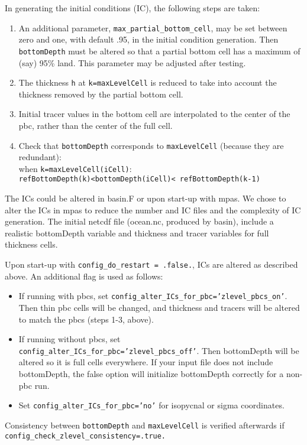 \documentclass[11pt]{report}
\begin{document}
In generating the initial conditions (IC), the following steps are taken:
\begin{enumerate}
\item An additional parameter, {\tt max\_partial\_bottom\_cell}, may be set between zero and one, with default .95, in the initial condition generation.  Then {\tt bottomDepth} must be altered so that a partial bottom cell has a maximum of (say) 95\% land.  This parameter may be adjusted after testing. 
\item The thickness {\tt h} at {\tt k=maxLevelCell} is reduced to take into account the thickness removed by the partial bottom cell.
\item Initial tracer values in the bottom cell are interpolated to the center of the pbc, rather than the center of the full cell.
\item Check that {\tt bottomDepth} corresponds to {\tt maxLevelCell} (because they are redundant):\\
when {\tt k=maxLevelCell(iCell)}:\\
{\tt refBottomDepth(k)<bottomDepth(iCell)< refBottomDepth(k-1)}
\end{enumerate}

The ICs could be altered in basin.F or upon start-up with mpas.  We chose to alter the ICs in mpas to reduce the number and IC files and the complexity of IC generation.  The initial netcdf file (ocean.nc, produced by basin), include a realistic
 bottomDepth variable and thickness and tracer variables for full thickness cells.

Upon start-up with {\tt config\_do\_restart = .false.}, ICs are altered as described above.  An additional flag is used as follows:
\begin{itemize}
\item If running with pbcs, set {\tt config\_alter\_ICs\_for\_pbc='zlevel\_pbcs\_on'}. Then thin pbc cells
   will be changed, and thickness and tracers will be altered to match the pbcs (steps 1-3, above).
\item If running without pbcs, set {\tt config\_alter\_ICs\_for\_pbc='zlevel\_pbcs\_off'}. Then 
   bottomDepth will be altered so it is full cells everywhere.
   If your input file does not include bottomDepth, the false option will
   initialize bottomDepth correctly for a non-pbc run.
\item Set {\tt config\_alter\_ICs\_for\_pbc='no'} for isopycnal or sigma coordinates.
\end{itemize}

Consistency between {\tt bottomDepth} and {\tt maxLevelCell} is verified afterwards if {\tt config\_check\_zlevel\_consistency=.true.}
\end{document}
